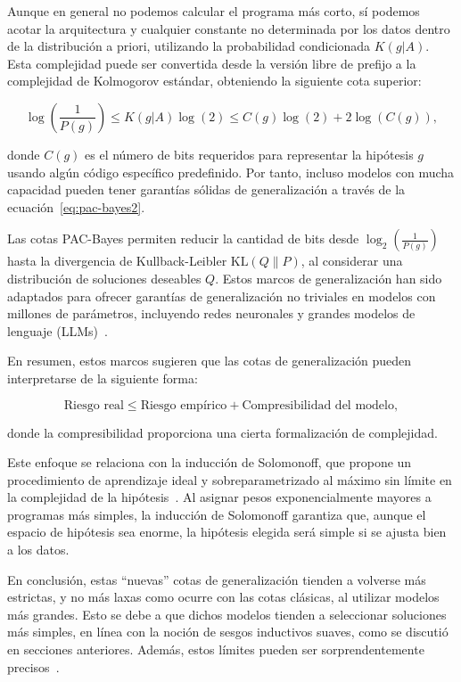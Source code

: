 Aunque en general no podemos calcular el programa más corto, sí podemos acotar la arquitectura y cualquier constante no determinada por los datos dentro de la distribución a priori, utilizando la probabilidad condicionada $K(g|A)$. Esta complejidad puede ser convertida desde la versión libre de prefijo a la complejidad de Kolmogorov estándar, obteniendo la siguiente cota superior:

\begin{equation}
    \log \left( \frac{1}{P(g)} \right) \leq K(g|A)\log (2) \leq C(g)\log (2) + 2\log (C(g)),
\end{equation}
    
donde $C(g)$ es el número de bits requeridos para representar la hipótesis $g$ usando algún código específico predefinido. Por tanto, incluso modelos con mucha capacidad pueden tener garantías sólidas de generalización a través de la ecuación~\eqref{eq:pac-bayes2}.

Las cotas PAC-Bayes permiten reducir la cantidad de bits desde $\log_2 \left( \frac{1}{P(g)} \right)$ hasta la divergencia de Kullback-Leibler $\text{KL}(Q \| P)$, al considerar una distribución de soluciones deseables $Q$. Estos marcos de generalización han sido adaptados para ofrecer garantías de generalización no triviales en modelos con millones de parámetros, incluyendo redes neuronales y grandes modelos de lenguaje (LLMs)~\cite{Lotfi2024}.

En resumen, estos marcos sugieren que las cotas de generalización pueden interpretarse de la siguiente forma:

\[
    \text{Riesgo real} \leq \text{Riesgo empírico} + \text{Compresibilidad del modelo},
\]

donde la compresibilidad proporciona una cierta formalización de complejidad.

Este enfoque se relaciona con la inducción de Solomonoff, que propone un procedimiento de aprendizaje ideal y sobreparametrizado al máximo sin límite en la complejidad de la hipótesis~\cite{Solomonoff1964}. Al asignar pesos exponencialmente mayores a programas más simples, la inducción de Solomonoff garantiza que, aunque el espacio de hipótesis sea enorme, la hipótesis elegida será simple si se ajusta bien a los datos.

En conclusión, estas ``nuevas'' cotas de generalización tienden a volverse más estrictas, y no más laxas como ocurre con las cotas clásicas, al utilizar modelos más grandes. Esto se debe a que dichos modelos tienden a seleccionar soluciones más simples, en línea con la noción de sesgos inductivos suaves, como se discutió en secciones anteriores. Además, estos límites pueden ser sorprendentemente precisos~\cite{Lotfi2022}.

